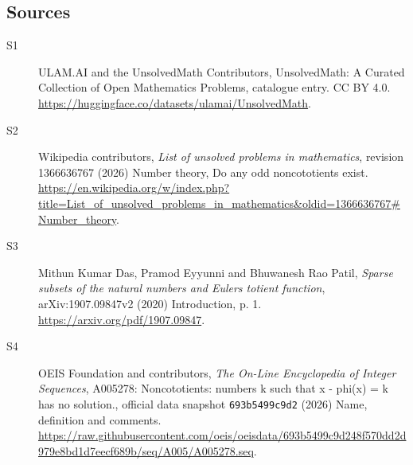 \documentclass[11pt]{article}
\begin{document}
\subsection{Sources}
\begin{description}
\item[\hypertarget{source:statement:1}{S1}] ULAM.AI and the UnsolvedMath Contributors, UnsolvedMath: A Curated Collection of Open Mathematics Problems, catalogue entry. CC BY 4.0. \url{https://huggingface.co/datasets/ulamai/UnsolvedMath}.
\item[\hypertarget{source:statement:2}{S2}] Wikipedia contributors, \emph{List of unsolved problems in mathematics}, revision 1366636767 (2026) Number theory, Do any odd noncototients exist. \url{https://en.wikipedia.org/w/index.php?title=List_of_unsolved_problems_in_mathematics&oldid=1366636767#Number_theory}.
\item[\hypertarget{source:statement:3}{S3}] Mithun Kumar Das, Pramod Eyyunni and Bhuwanesh Rao Patil, \emph{Sparse subsets of the natural numbers and Euler\textquotesingle s totient function}, arXiv:1907.09847v2 (2020) Introduction, p. 1. \url{https://arxiv.org/pdf/1907.09847}.
\item[\hypertarget{source:statement:4}{S4}] OEIS Foundation and contributors, \emph{The On-Line Encyclopedia of Integer Sequences}, A005278: Noncototients: numbers k such that x - phi(x) = k has no solution., official data snapshot \texttt{693b5499c9d2} (2026) Name, definition and comments. \url{https://raw.githubusercontent.com/oeis/oeisdata/693b5499c9d248f570dd2d979e8bd1d7eecf689b/seq/A005/A005278.seq}.
\end{description}
\label{end:statement}
\end{document}
